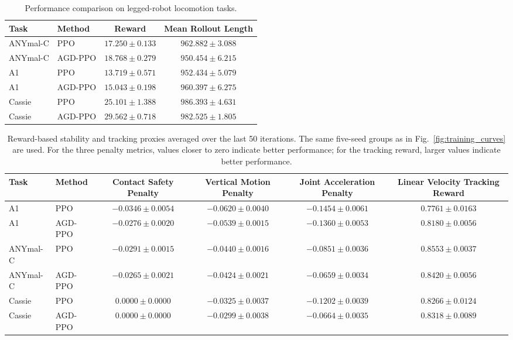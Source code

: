 \documentclass[conference]{IEEEtran}
\begin{document}
\begin{table}[t]
\centering
\caption{Performance comparison on legged-robot locomotion tasks.}
\label{tab:evaluation_results}
\begin{tabular}{llcc}
\hline
Task & Method & Reward & Mean Rollout Length \\
\hline
ANYmal-C & PPO     & $17.250\pm0.133$ & $962.882\pm3.088$ \\
ANYmal-C & AGD-PPO & $\bm{18.768\pm0.279}$ & $950.454\pm6.215$ \\
\hline
A1 & PPO     & $13.719\pm0.571$ & $952.434\pm5.079$  \\
A1 & AGD-PPO & $\bm{15.043\pm0.198}$ & $960.397\pm6.275$ \\
\hline
Cassie & PPO     & $25.101\pm1.388$ & $986.393\pm4.631$ \\
Cassie & AGD-PPO & $\bm{29.562\pm0.718}$ & $982.525\pm1.805$ \\
\hline
\end{tabular}
\end{table}

\begin{table}[t]
\centering
\caption{Reward-based stability and tracking proxies averaged over the last 50 iterations. The same five-seed groups as in Fig.~\ref{fig:training_curves} are used. For the three penalty metrics, values closer to zero indicate better performance; for the tracking reward, larger values indicate better performance.}
\label{tab:safety_metrics}
\begin{tabular}{llcccc}
\hline
Task & Method & Contact Safety Penalty & Vertical Motion Penalty & Joint Acceleration Penalty & Linear Velocity Tracking Reward \\
\hline
A1 & PPO & $-0.0346 \pm 0.0054$ & $-0.0620 \pm 0.0040$ & $-0.1454 \pm 0.0061$ & $0.7761 \pm 0.0163$ \\
A1 & AGD-PPO & $\bm{-0.0276 \pm 0.0020}$ & $\bm{-0.0539 \pm 0.0015}$ & $\bm{-0.1360 \pm 0.0053}$ & $\bm{0.8180 \pm 0.0056}$ \\
\hline
ANYmal-C & PPO & $-0.0291 \pm 0.0015$ & $-0.0440 \pm 0.0016$ & $-0.0851 \pm 0.0036$ & $\bm{0.8553 \pm 0.0037}$ \\
ANYmal-C & AGD-PPO & $\bm{-0.0265 \pm 0.0021}$ & $\bm{-0.0424 \pm 0.0021}$ & $\bm{-0.0659 \pm 0.0034}$ & $0.8420 \pm 0.0056$ \\
\hline
Cassie & PPO & $0.0000 \pm 0.0000$ & $-0.0325 \pm 0.0037$ & $-0.1202 \pm 0.0039$ & $0.8266 \pm 0.0124$ \\
Cassie & AGD-PPO & $0.0000 \pm 0.0000$ & $\bm{-0.0299 \pm 0.0038}$ & $\bm{-0.0664 \pm 0.0035}$ & $\bm{0.8318 \pm 0.0089}$ \\
\hline
\end{tabular}
\end{table}
\end{document}
